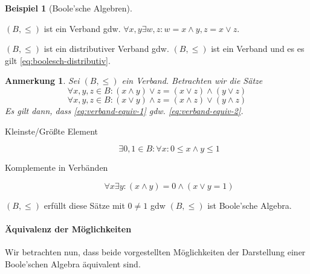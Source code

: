 \documentclass{article}
\theoremstyle{definition}
\newtheorem*{bsp}{Beispiel}
\theoremstyle{plain}
\newtheorem*{anm}{Anmerkung}
\begin{document}
\begin{bsp}[Boole'sche Algebren]
\begin{description}
            $ (B, \leq) $ ist ein Verband gdw. $ \forall x, y \exists w, z: w = x \land y, z = x \lor z $.

            $ (B, \leq) $ ist ein distributiver Verband gdw. $ (B, \leq) $ ist ein Verband und es es gilt \eqref{eq:boolesch-distributiv}.

            \begin{anm}
                Sei $ (B, \leq) $ ein Verband.
                Betrachten wir die Sätze
                \begin{equation}
                \label{eq:verband-equiv-1}
                    \forall x, y, z \in B: (x \land y) \lor z = (x \lor z) \land (y \lor z)
                \end{equation}
                \begin{equation}
                \label{eq:verband-equiv-2}
                    \forall x, y, z \in B: (x \lor y) \land z = (x \land z) \lor (y \land z)
                \end{equation}
                Es gilt dann, dass \eqref{eq:verband-equiv-1} gdw. \eqref{eq:verband-equiv-2}.
            \end{anm}

            \begin{description}
                \item[Kleinste/Größte Element]
                \begin{equation*}
                    \exists 0,1 \in B : \forall x: 0 \leq x \land y \leq 1
                \end{equation*}

                \item[Komplemente in Verbänden]
                \begin{equation*}
                    \forall x \exists y: (x \land y) = 0 \land (x \lor y = 1)
                \end{equation*}
            \end{description}

            $ (B, \leq) $ erfüllt diese Sätze mit $ 0 \not = 1 $ gdw $ (B, \leq) $ ist Boole'sche Algebra.
        \end{description}

        \paragraph{Äquivalenz der Möglichkeiten}
        Wir betrachten nun, dass beide vorgestellten Möglichkeiten der Darstellung einer Boole'schen Algebra äquivalent sind.


\end{bsp}
\end{document}
